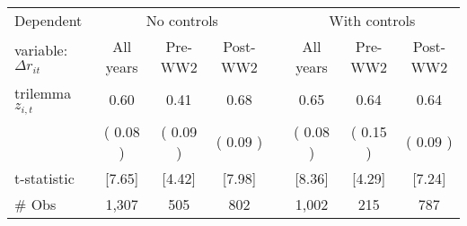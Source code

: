 \begin{tabular}{lccccccc}
\toprule
Dependent & \multicolumn{3}{c}{No controls} && \multicolumn{3}{c}{With controls} \\  \cline{2-4} \cline{6-8}
variable: $\Delta r_{it}$                    &\multicolumn{1}{c}{All years}&\multicolumn{1}{c}{Pre-WW2}&\multicolumn{1}{c}{Post-WW2}& &\multicolumn{1}{c}{All years}&\multicolumn{1}{c}{Pre-WW2}&\multicolumn{1}{c}{Post-WW2}\\
\midrule
trilemma $ z_{i,t}$ &   0.60\sym{***} &   0.41\sym{***} &   0.68\sym{***} &&   0.65\sym{***} &   0.64\sym{***} &   0.64\sym{***} \\
& (  0.08 ) & (  0.09 ) & (  0.09 ) && (  0.08 ) & (  0.15 ) & (  0.09 )   \\
t-statistic & [7.65] & [4.42] & [7.98] && [8.36] & [4.29] & [7.24] \\
\# Obs &        1,307 &          505 &          802 & &        1,002 &          215 &          787 \\
\bottomrule
\end{tabular}
